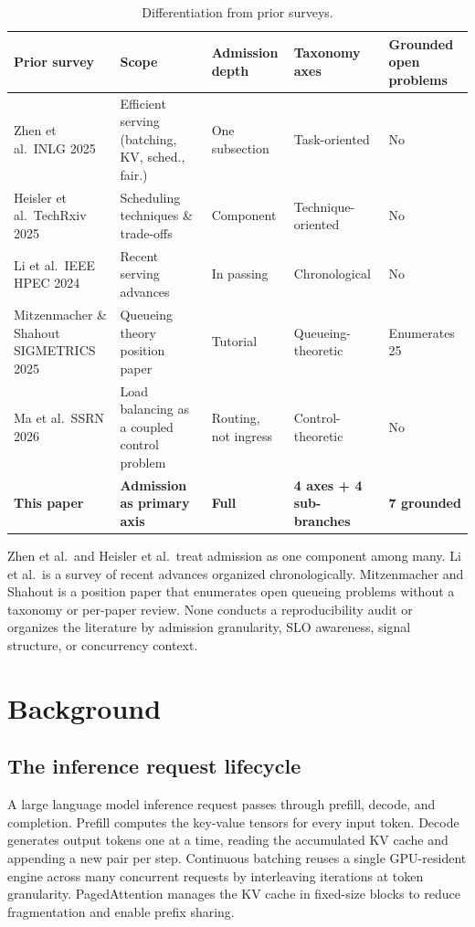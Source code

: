 \documentclass[11pt,letterpaper]{article}
\theoremstyle{definition}
\begin{document}
\begin{table}[htbp]
\centering
\caption{Differentiation from prior surveys.}
\label{tab:diff}
\small
{}
\begin{tabular}{p{3.4cm} p{3.2cm} p{2.2cm} p{2.4cm} p{2cm}}
\toprule
\rowcolor{admitteallight}
\textbf{Prior survey} & \textbf{Scope} & \textbf{Admission depth} & \textbf{Taxonomy axes} & \textbf{Grounded open problems} \\
\midrule
Zhen et al.\ INLG 2025 & Efficient serving (batching, KV, sched., fair.) & One subsection & Task-oriented & No \\
Heisler et al.\ TechRxiv 2025 & Scheduling techniques \& trade-offs & Component & Technique-oriented & No \\
Li et al.\ IEEE HPEC 2024 & Recent serving advances & In passing & Chronological & No \\
Mitzenmacher \& Shahout SIGMETRICS 2025 & Queueing theory position paper & Tutorial & Queueing-theoretic & Enumerates 25 \\
Ma et al.\ SSRN 2026 & Load balancing as a coupled control problem & Routing, not ingress & Control-theoretic & No \\
\rowcolor{admitgreylight}
\textbf{This paper} & \textbf{Admission as primary axis} & \textbf{Full} & \textbf{4 axes + 4 sub-branches} & \textbf{7 grounded} \\
\bottomrule
\end{tabular}
\end{table}

Zhen et al.\ and Heisler et al.\ treat admission as one component among
many. Li et al.\ is a survey of recent advances organized
chronologically. Mitzenmacher and Shahout is a position paper that
enumerates open queueing problems without a taxonomy or per-paper
review. None conducts a reproducibility audit or organizes the
literature by admission granularity, SLO awareness, signal structure,
or concurrency context.

\section{Background}
\label{sec:bg}

\subsection{The inference request lifecycle}

A large language model inference request passes through prefill,
decode, and completion. Prefill computes the key-value tensors for
every input token. Decode generates output tokens one at a time,
reading the accumulated KV cache and appending a new pair per step.
Continuous batching \cite{yu2022orca} reuses a single GPU-resident
engine across many concurrent requests by interleaving iterations at
token granularity. PagedAttention \cite{kwon2023pagedattention} manages
the KV cache in fixed-size blocks to reduce fragmentation and enable
prefix sharing.
\end{document}
